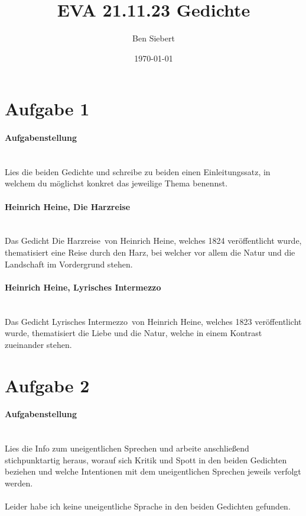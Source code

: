 \documentclass[12pt, a4paper]{article}
\begin{document}
    \renewcommand{\baselinestretch}{1.5}\normalsize

    \title{EVA 21.11.23 Gedichte}
    \author{Ben Siebert}
    \date{\today}
    \maketitle

    \thispagestyle{empty}
    \clearpage

    \newpage
    \setcounter{page}{1}

    \section{Aufgabe 1}
    \paragraph{Aufgabenstellung} \mbox{} \\
    Lies die beiden Gedichte und schreibe zu beiden einen Einleitungssatz, in welchem du möglichst konkret das jeweilige Thema benennst.

    \paragraph{Heinrich Heine, Die Harzreise} \mbox{} \\
    Das Gedicht \dq Die Harzreise\dq\ von Heinrich Heine, welches 1824 veröffentlicht wurde, thematisiert eine Reise durch den Harz, bei welcher vor allem die Natur und die Landschaft im Vordergrund stehen.

    \paragraph{Heinrich Heine, Lyrisches Intermezzo} \mbox{} \\
    Das Gedicht \dq Lyrisches Intermezzo\dq\ von Heinrich Heine, welches 1823 veröffentlicht wurde, thematisiert die Liebe und die Natur, welche in einem Kontrast zueinander stehen.

    \section{Aufgabe 2}
    \paragraph{Aufgabenstellung} \mbox{} \\
    Lies die Info zum uneigentlichen Sprechen und arbeite anschließend stichpunktartig heraus, worauf sich Kritik und Spott in den beiden Gedichten beziehen und welche Intentionen mit dem uneigentlichen Sprechen jeweils verfolgt werden.
	\\\\
	Leider habe ich keine uneigentliche Sprache in den beiden Gedichten gefunden.
\end{document}
